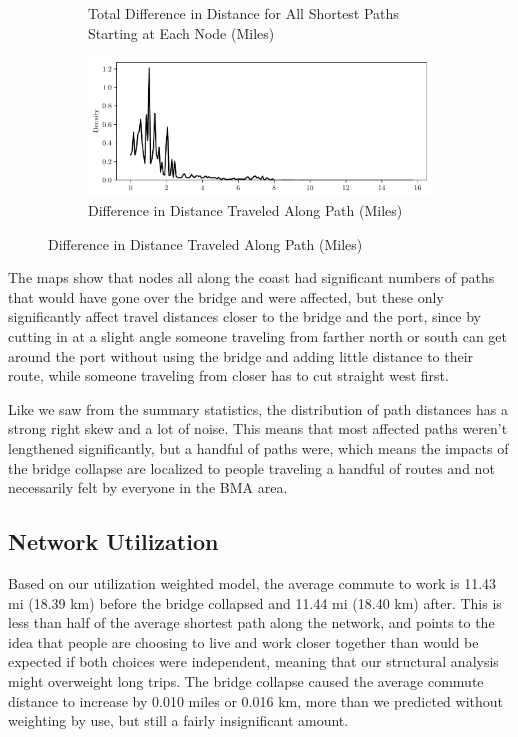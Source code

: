 \documentclass[11pt]{article}
\numberwithin{equation}{section} %
\numberwithin{figure}{section} %
\numberwithin{table}{section} %
\theoremstyle{definition}
\begin{document}
\begin{figure}[t!]
\begin{subfigure}{0.49\textwidth}
    \caption{Total Difference in Distance for All Shortest Paths Starting at Each Node (Miles)}
  \end{subfigure}
  \begin{subfigure}{\textwidth}
    \centering
    \includegraphics[width=\textwidth]{graphs/path_dists.pdf}
    \caption{Difference in Distance Traveled Along Path (Miles)}
  \end{subfigure}

  \label{fig:spaths}
\end{figure}

The maps show that nodes all along the coast had significant numbers of paths that would have gone over the bridge and were affected, but these only significantly affect travel distances closer to the bridge and the port, since by cutting in at a slight angle someone traveling from farther north or south can get around the port without using the bridge and adding little distance to their route, while someone traveling from closer has to cut straight west first.

Like we saw from the summary statistics, the distribution of path distances has a strong right skew and a lot of noise. This means that most affected paths weren't lengthened significantly, but a handful of paths were, which means the impacts of the bridge collapse are localized to people traveling a handful of routes and not necessarily felt by everyone in the BMA area.


\subsection{Network Utilization}

Based on our utilization weighted model, the average commute to work is 11.43 mi (18.39 km) before the bridge collapsed and 11.44 mi (18.40 km) after. This is less than half of the average shortest path along the network, and points to the idea that people are choosing to live and work closer together than would be expected if both choices were independent, meaning that our structural analysis might overweight long trips. The bridge collapse caused the average commute distance to increase by 0.010 miles or 0.016 km, more than we predicted without weighting by use, but still a fairly insignificant amount.
\end{document}
